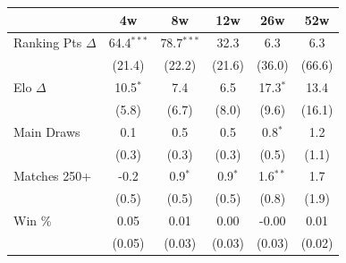 \begin{tabular}{l*{5}{c}}
\toprule
 & 4w & 8w & 12w & 26w & 52w \\
\midrule
Ranking Pts $\Delta$ & 64.4$^{***}$ & 78.7$^{***}$ & 32.3 & 6.3 & 6.3 \\
 & (21.4) & (22.2) & (21.6) & (36.0) & (66.6) \\[0.3em]
Elo $\Delta$ & 10.5$^{*}$ & 7.4 & 6.5 & 17.3$^{*}$ & 13.4 \\
 & (5.8) & (6.7) & (8.0) & (9.6) & (16.1) \\[0.3em]
Main Draws & 0.1 & 0.5 & 0.5 & 0.8$^{*}$ & 1.2 \\
 & (0.3) & (0.3) & (0.3) & (0.5) & (1.1) \\[0.3em]
Matches 250+ & -0.2 & 0.9$^{*}$ & 0.9$^{*}$ & 1.6$^{**}$ & 1.7 \\
 & (0.5) & (0.5) & (0.5) & (0.8) & (1.9) \\[0.3em]
Win \% & 0.05 & 0.01 & 0.00 & -0.00 & 0.01 \\
 & (0.05) & (0.03) & (0.03) & (0.03) & (0.02) \\[0.3em]
\bottomrule
\end{tabular}
